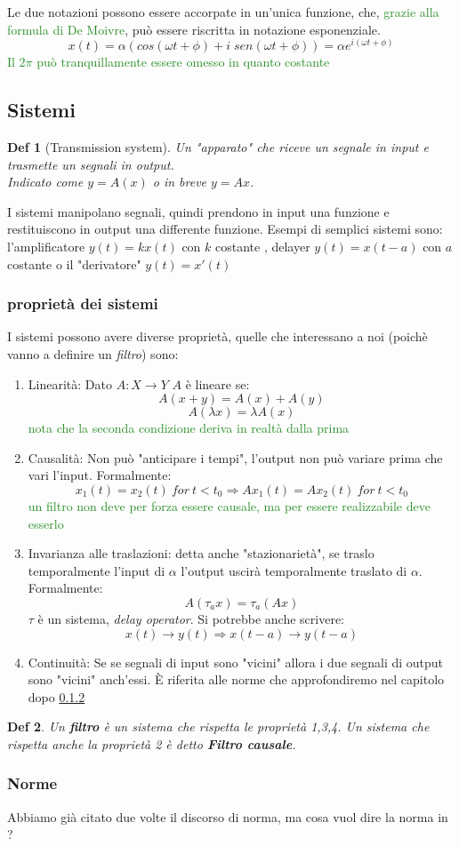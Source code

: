 \documentclass[a4paper]{article}
\newtheorem*{definition}{Def}
\newcommand{\appunto}[1]{\textcolor{ForestGreen}{#1}}
\newcommand{\C}[0]{\mathbb{C}}
\begin{document}
Le due notazioni possono essere accorpate in un'unica funzione, che, \appunto{grazie alla formula di De Moivre}, può essere riscritta in notazione esponenziale.
$$x(t) = \alpha (cos(\omega t + \phi) + i \; sen ( \omega t + \phi)) = \alpha e^{i(\omega t + \phi)}$$
\appunto{Il $2 \pi$ può tranquillamente essere omesso in quanto costante}

\subsection{Sistemi}
\begin{definition}[Transmission system]
	Un "apparato" che riceve un segnale in input e trasmette un segnali in output.\\ Indicato come $y=A(x)$ o in breve $y=Ax$.
\end{definition}
I sistemi manipolano segnali, quindi prendono in input una funzione e restituiscono in output una differente funzione.
Esempi di semplici sistemi sono: l'amplificatore $y(t) = kx(t)$ con $k$ costante , delayer $y(t) = x(t-a)$ con $a$ costante o il "derivatore" $y(t) = x'(t)$

\subsubsection{proprietà dei sistemi}
I sistemi possono avere diverse proprietà, quelle che interessano a noi (poichè vanno a definire un \textit{filtro}) sono:
\begin{enumerate}
	\item Linearità: Dato $A: X \rightarrow Y$ $A$ è lineare se:
		$$A(x + y) = A(x) + A(y)$$
		$$A(\lambda x) = \lambda A(x)$$
	\appunto{nota che la seconda condizione deriva in realtà dalla prima}
	\item Causalità: Non può "anticipare i tempi", l'output non può variare prima che vari l'input.
		Formalmente: 
		$$ x_1(t) = x_2(t)\: for \: t<t_0 \Rightarrow Ax_1(t) = Ax_2(t)\: for \: t<t_0 $$
		\appunto{un filtro non deve per forza essere causale, ma per essere realizzabile deve esserlo}
	\item Invarianza alle traslazioni: detta anche "stazionarietà", se traslo temporalmente l'input di $\alpha$ l'output uscirà temporalmente traslato di $\alpha$. 
		Formalmente:
		$$ A(\tau_a x) = \tau_a (Ax)$$
		$\tau$ è un sistema, \textit{delay operator}. Si potrebbe anche scrivere:
		$$ x(t) \rightarrow y(t) \Rightarrow x(t-a) \rightarrow y(t-a)$$
	\item Continuità: Se se segnali di input sono "vicini" allora i due segnali di output sono "vicini" anch'essi. 
		È riferita alle norme che approfondiremo nel capitolo dopo \ref{section:norme}
\end{enumerate}
\begin{definition}
	Un \textbf{filtro} è un sistema che rispetta le proprietà 1,3,4. Un sistema che rispetta anche la proprietà 2 è detto \textbf{Filtro causale}.
\end{definition}
\subsubsection{Norme}
\label{section:norme}
Abbiamo già citato due volte il discorso di norma, ma cosa vuol dire la norma in \C ?
\end{document}

